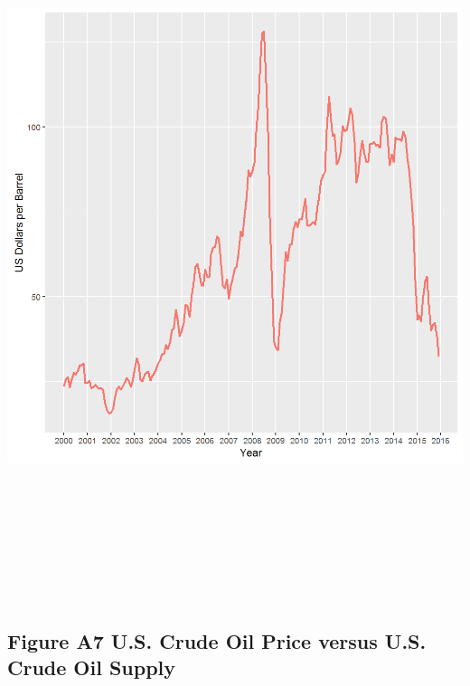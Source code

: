 \documentclass[]{article}
\begin{document}
\includegraphics[height=8.33333in]{images/EIAdata_us_crudeoil_price.png}

\newpage

\subsection{Figure A7 U.S. Crude Oil Price versus U.S. Crude Oil
Supply}\label{figure-a7-u.s.-crude-oil-price-versus-u.s.-crude-oil-supply}
\end{document}

